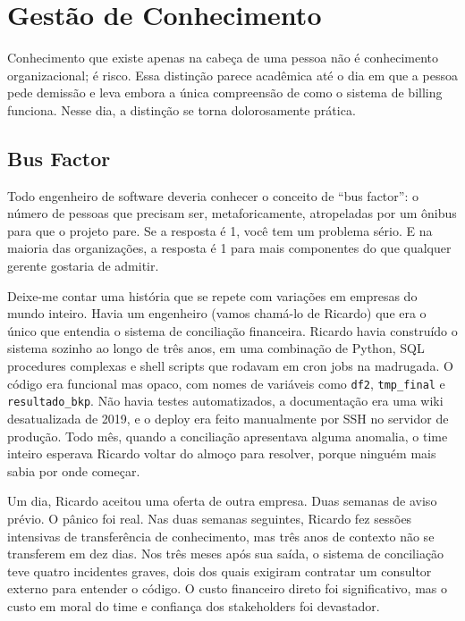 \section{Gestão de Conhecimento}

Conhecimento que existe apenas na cabeça de uma pessoa não é conhecimento
organizacional; é risco. Essa distinção parece acadêmica até o dia em que
a pessoa pede demissão e leva embora a única compreensão de como o sistema
de billing funciona. Nesse dia, a distinção se torna dolorosamente prática.

\subsection{Bus Factor}

Todo engenheiro de software deveria conhecer o conceito de ``bus factor'': o
número de pessoas que precisam ser, metaforicamente, atropeladas por um
ônibus para que o projeto pare. Se a resposta é 1, você tem um problema
sério. E na maioria das organizações, a resposta é 1 para mais componentes
do que qualquer gerente gostaria de admitir.

Deixe-me contar uma história que se repete com variações em empresas do
mundo inteiro. Havia um engenheiro (vamos chamá-lo de Ricardo) que era o
único que entendia o sistema de conciliação financeira. Ricardo havia
construído o sistema sozinho ao longo de três anos, em uma combinação de
Python, SQL procedures complexas e shell scripts que rodavam em cron jobs na
madrugada. O código era funcional mas opaco, com nomes de variáveis como
\texttt{df2}, \texttt{tmp\_final} e \texttt{resultado\_bkp}. Não havia testes
automatizados, a documentação era uma wiki desatualizada de 2019, e o deploy
era feito manualmente por SSH no servidor de produção. Todo mês, quando a
conciliação apresentava alguma anomalia, o time inteiro esperava Ricardo
voltar do almoço para resolver, porque ninguém mais sabia por onde começar.

Um dia, Ricardo aceitou uma oferta de outra empresa. Duas semanas de aviso
prévio. O pânico foi real. Nas duas semanas seguintes, Ricardo fez sessões
intensivas de transferência de conhecimento, mas três anos de contexto não se
transferem em dez dias. Nos três meses após sua saída, o sistema de
conciliação teve quatro incidentes graves, dois dos quais exigiram
contratar um consultor externo para entender o código. O custo financeiro
direto foi significativo, mas o custo em moral do time e confiança dos
stakeholders foi devastador.

